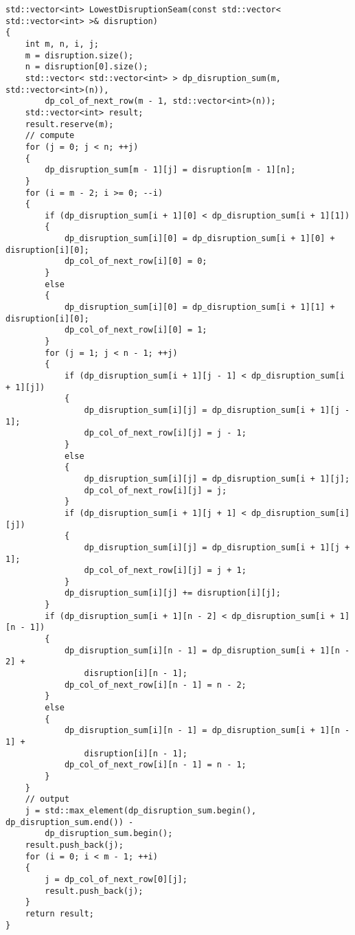 \begin{verbatim}
std::vector<int> LowestDisruptionSeam(const std::vector< std::vector<int> >& disruption)
{
    int m, n, i, j;
    m = disruption.size();
    n = disruption[0].size();
    std::vector< std::vector<int> > dp_disruption_sum(m, std::vector<int>(n)), 
        dp_col_of_next_row(m - 1, std::vector<int>(n));
    std::vector<int> result;
    result.reserve(m);
    // compute
    for (j = 0; j < n; ++j)
    {
        dp_disruption_sum[m - 1][j] = disruption[m - 1][n];
    }
    for (i = m - 2; i >= 0; --i)
    {
        if (dp_disruption_sum[i + 1][0] < dp_disruption_sum[i + 1][1])
        {
            dp_disruption_sum[i][0] = dp_disruption_sum[i + 1][0] + disruption[i][0];
            dp_col_of_next_row[i][0] = 0;
        }
        else
        {
            dp_disruption_sum[i][0] = dp_disruption_sum[i + 1][1] + disruption[i][0];
            dp_col_of_next_row[i][0] = 1;
        }
        for (j = 1; j < n - 1; ++j)
        {
            if (dp_disruption_sum[i + 1][j - 1] < dp_disruption_sum[i + 1][j])
            {
                dp_disruption_sum[i][j] = dp_disruption_sum[i + 1][j - 1];
                dp_col_of_next_row[i][j] = j - 1;
            }
            else
            {
                dp_disruption_sum[i][j] = dp_disruption_sum[i + 1][j];
                dp_col_of_next_row[i][j] = j;
            }
            if (dp_disruption_sum[i + 1][j + 1] < dp_disruption_sum[i][j])
            {
                dp_disruption_sum[i][j] = dp_disruption_sum[i + 1][j + 1];
                dp_col_of_next_row[i][j] = j + 1;
            }
            dp_disruption_sum[i][j] += disruption[i][j];
        }
        if (dp_disruption_sum[i + 1][n - 2] < dp_disruption_sum[i + 1][n - 1])
        {
            dp_disruption_sum[i][n - 1] = dp_disruption_sum[i + 1][n - 2] + 
                disruption[i][n - 1];
            dp_col_of_next_row[i][n - 1] = n - 2;
        }
        else
        {
            dp_disruption_sum[i][n - 1] = dp_disruption_sum[i + 1][n - 1] + 
                disruption[i][n - 1];
            dp_col_of_next_row[i][n - 1] = n - 1;
        }
    }
    // output
    j = std::max_element(dp_disruption_sum.begin(), dp_disruption_sum.end()) - 
        dp_disruption_sum.begin();
    result.push_back(j);
    for (i = 0; i < m - 1; ++i)
    {
        j = dp_col_of_next_row[0][j];
        result.push_back(j);
    }
    return result;
}
\end{verbatim}


